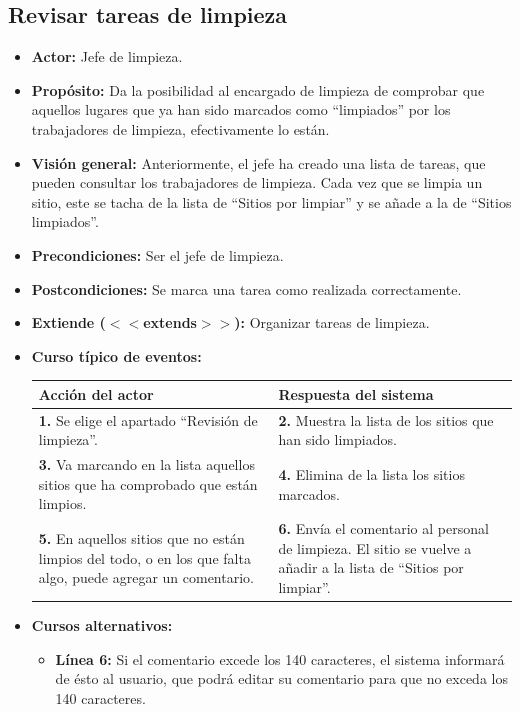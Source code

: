 \documentclass[spanish,a4paper,11pt, twoside]{report}	%
\begin{document}

	\subsection{Revisar tareas de limpieza}
			\begin{itemize}
				\item \textbf{Actor: }Jefe de limpieza.
				\item \textbf{Propósito: }Da la posibilidad al encargado de limpieza de
					comprobar que aquellos lugares que ya han sido marcados como ``limpiados''  por
					los trabajadores de limpieza, efectivamente lo están.
				\item \textbf{Visión general: }Anteriormente, el jefe ha creado una lista de
					tareas, que pueden consultar los trabajadores de limpieza. Cada vez que se
					limpia un sitio, este se tacha de la lista de ``Sitios por limpiar'' y se añade a
					la de ``Sitios limpiados''.
				\item \textbf{Precondiciones:} Ser el jefe de limpieza.
				\item \textbf{Postcondiciones:} Se marca una tarea como realizada correctamente.
				\item \textbf{Extiende ($<<$extends$>>$):} Organizar tareas de limpieza.
				\item \textbf{Curso típico de eventos:}\\
				\begin{tabular}{|p{6cm}||p{6cm}|}
					\hline
					\textbf{Acción del actor} & \textbf{Respuesta del sistema} \\ \hline \hline
					\textbf{1.} Se elige el apartado ``Revisión de limpieza''. &
					\textbf{2.} Muestra la lista de los sitios que han sido limpiados. \\ \hline
					\textbf{3.} Va marcando en la lista aquellos sitios que ha comprobado que están limpios.	& 
					\textbf{4.} Elimina de la lista los sitios marcados. \\ \hline
					\textbf{5.} En aquellos sitios que no están limpios del todo, o en los que falta
						algo, puede agregar un comentario. & 
					\textbf{6.} Envía el comentario al personal de limpieza. El sitio se vuelve a añadir a la lista de
						``Sitios por limpiar''.\\ \hline
				\end{tabular}
			\item \textbf{Cursos alternativos:} 
				\begin{itemize}
					\item \textbf{Línea 6: }Si el comentario excede los 140 caracteres, el sistema
						informará de ésto al usuario, que podrá editar su comentario para que no exceda
						los 140 caracteres.
				\end{itemize}
		\end {itemize}
\end{document}
